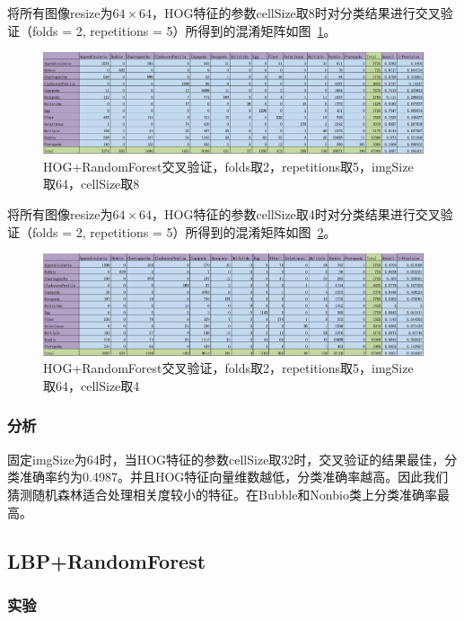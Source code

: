 \documentclass[12pt]{article}
\begin{document}
将所有图像resize为$64 \times 64$，HOG特征的参数cellSize取8时对分类结果进行交叉验证（folds = 2, repetitions = 5）所得到的混淆矩阵如图~\ref{fig: HOG-RF-2-folds-5-repetitions-8-64}。
\begin{figure}[!ht]
\centering
\includegraphics[width=1.0\linewidth]{HOG-RF-2-folds-5-repetitions-8-64}
\caption{HOG+RandomForest交叉验证，folds取2，repetitions取5，imgSize取64，cellSize取8}
\label{fig: HOG-RF-2-folds-5-repetitions-8-64}
\end{figure}

将所有图像resize为$64 \times 64$，HOG特征的参数cellSize取4时对分类结果进行交叉验证（folds = 2, repetitions = 5）所得到的混淆矩阵如图~\ref{fig: HOG-RF-2-folds-5-repetitions-4-64}。
\begin{figure}[!ht]
\centering
\includegraphics[width=1.0\linewidth]{HOG-RF-2-folds-5-repetitions-4-64}
\caption{HOG+RandomForest交叉验证，folds取2，repetitions取5，imgSize取64，cellSize取4}
\label{fig: HOG-RF-2-folds-5-repetitions-4-64}
\end{figure}

\subsubsection{分析}

固定imgSize为64时，当HOG特征的参数cellSize取32时，交叉验证的结果最佳，分类准确率约为0.4987。并且HOG特征向量维数越低，分类准确率越高。因此我们猜测随机森林适合处理相关度较小的特征。在Bubble和Nonbio类上分类准确率最高。

\subsection{LBP+RandomForest}

\subsubsection{实验}
\end{document}
